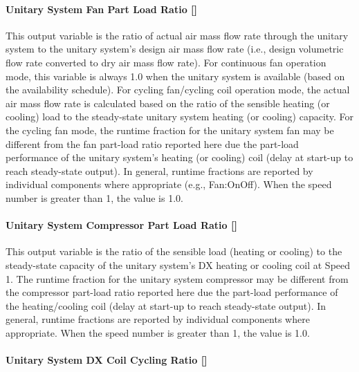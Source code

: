 \paragraph{\texorpdfstring{Unitary System Fan Part Load Ratio {[]}}{Unitary System Fan Part Load Ratio }}\label{unitary-system-fan-part-load-ratio}

This output variable is the ratio of actual air mass flow rate through the unitary system to the unitary system's design air mass flow rate (i.e., design volumetric flow rate converted to dry air mass flow rate). For continuous fan operation mode, this variable is always 1.0 when the unitary system is available (based on the availability schedule). For cycling fan/cycling coil operation mode, the actual air mass flow rate is calculated based on the ratio of the sensible heating (or cooling) load to the steady-state unitary system heating (or cooling) capacity. For the cycling fan mode, the runtime fraction for the unitary system fan may be different from the fan part-load ratio reported here due the part-load performance of the unitary system's heating (or cooling) coil (delay at start-up to reach steady-state output). In general, runtime fractions are reported by individual components where appropriate (e.g., Fan:OnOff). When the speed number is greater than 1, the value is 1.0.

\paragraph{\texorpdfstring{Unitary System Compressor Part Load Ratio {[]}}{Unitary System Compressor Part Load Ratio }}\label{unitary-system-compressor-part-load-ratio}

This output variable is the ratio of the sensible load (heating or cooling) to the steady-state capacity of the unitary system's DX heating or cooling coil at Speed 1. The runtime fraction for the unitary system compressor may be different from the compressor part-load ratio reported here due the part-load performance of the heating/cooling coil (delay at start-up to reach steady-state output). In general, runtime fractions are reported by individual components where appropriate. When the speed number is greater than 1, the value is 1.0.

\paragraph{\texorpdfstring{Unitary System DX Coil Cycling Ratio {[]}}{Unitary System DX Coil Cycling Ratio }}\label{unitary-system-dx-coil-cycling-ratio}

